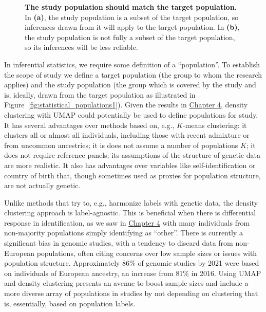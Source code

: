 \begin{figure}[h]
\begin{subfigure}{0.45\linewidth}
    \caption{}
    \label{fig:statistical_populations2}
\end{subfigure}
\caption[The relationship between target and study populations]{\textbf{The study population should match the target population.} In \textbf{(a)}, the study population is a subset of the target population, so inferences drawn from it will apply to the target population. In \textbf{(b)}, the study population is not fully a subset of the target population, so its inferences will be less reliable.}
\label{fig:statistical_populations}
\end{figure}

In inferential statistics, we require some definition of a ``population''. To establish the scope of study we define a target population (the group to whom the research applies) and the study population (the group which is covered by the study and is, ideally, drawn from the target population as illustrated in Figure~\ref{fig:statistical_populations1})\citep{statcan2003}. Given the results in \hyperref[chap:chapter4]{Chapter 4}, density clustering with UMAP could potentially be used to define populations for study. It has several advantages over methods based on, e.g., $K$-means clustering: it clusters all or almost all individuals, including those with recent admixture or from uncommon ancestries; it is does not assume a number of populations $K$; it does not require reference panels; its assumptions of the structure of genetic data are more realistic. It also has advantages over variables like self-identification or country of birth that, though sometimes used as proxies for population structure, are not actually genetic. 

Unlike methods that try to, e.g., harmonize labels with genetic data, the density clustering approach is label-agnostic. This is beneficial when there is differential response in identification, as we saw in \hyperref[chap:chapter4]{Chapter 4}  with many individuals from non-majority populations simply identifying as ``other''. There is currently a significant bias in genomic studies, with a tendency to discard data from non-European populations, often citing concerns over low sample sizes or issues with population structure\citep{ben-eghan_dont_2020}. Approximately $86\%$ of genomic studies by 2021 were based on individuals of European ancestry, an increase from $81\%$ in 2016\citep{fatumo_roadmap_2022,kaplan_polygenic_2022}. Using UMAP and density clustering presents an avenue to boost sample sizes and include a more diverse array of populations in studies by not depending on clustering that is, essentially, based on population labels.

